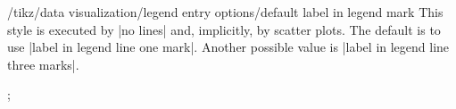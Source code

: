\begin{stylekey}{/tikz/data visualization/legend entry options/default
    label in legend mark}
  This style is executed by |no lines| and, implicitly, by scatter
  plots. The default is to use
  |label in legend line one mark|. Another possible value is
  |label in legend line three marks|.
\begin{codeexample}[width=5cm]
\tikz \datavisualization [
  visualize as scatter/.list={a,b,c}, 
  style sheet=cross marks,
  legend entry options/default label in legend mark/.style=
    label in legend three marks,
  a={label in legend={text=example a}},
  b={label in legend={text=example b}},
  c={label in legend={text=example c}}];
\end{codeexample}
\end{stylekey}

